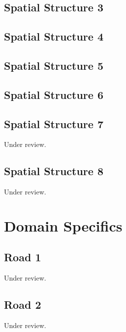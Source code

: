 \documentclass{scrartcl}
\begin{document}
\subsection{Spatial Structure 3}
\label{sec:spatial_3}
\clearpage

\subsection{Spatial Structure 4}
\label{sec:spatial_4}
\clearpage

\subsection{Spatial Structure 5}
\label{sec:spatial_5}
\clearpage

\subsection{Spatial Structure 6}
\label{sec:spatial_6}
\clearpage

\subsection{Spatial Structure 7} %
\label{sec:spatial_7}
Under review.%
\clearpage

\subsection{Spatial Structure 8} %
\label{sec:spatial_8}
Under review.%
\clearpage

\section{Domain Specifics}

\subsection{Road 1}  %
\label{sec:road_1}
Under review.%
\clearpage

\subsection{Road 2} %
\label{sec:road_2}
Under review.%
\clearpage
\end{document}
